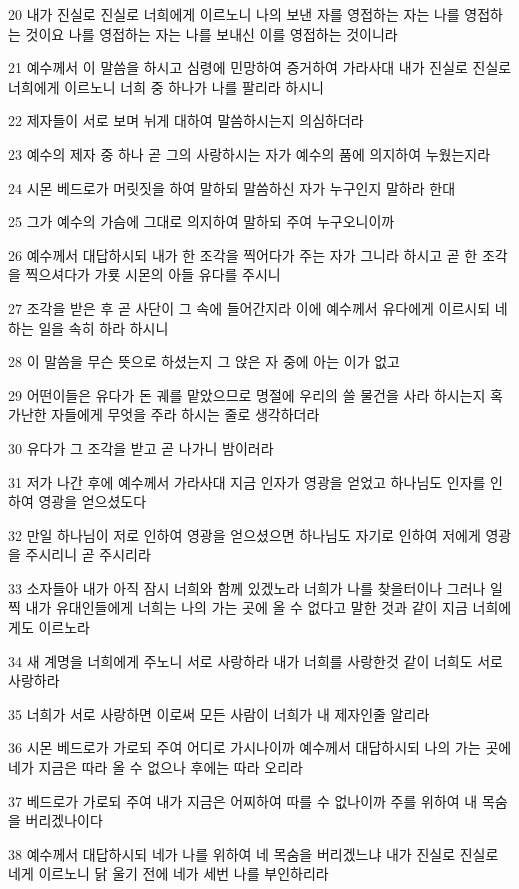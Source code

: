\par 20 내가 진실로 진실로 너희에게 이르노니 나의 보낸 자를 영접하는 자는 나를 영접하는 것이요 나를 영접하는 자는 나를 보내신 이를 영접하는 것이니라
\par 21 예수께서 이 말씀을 하시고 심령에 민망하여 증거하여 가라사대 내가 진실로 진실로 너희에게 이르노니 너희 중 하나가 나를 팔리라 하시니
\par 22 제자들이 서로 보며 뉘게 대하여 말씀하시는지 의심하더라
\par 23 예수의 제자 중 하나 곧 그의 사랑하시는 자가 예수의 품에 의지하여 누웠는지라
\par 24 시몬 베드로가 머릿짓을 하여 말하되 말씀하신 자가 누구인지 말하라 한대
\par 25 그가 예수의 가슴에 그대로 의지하여 말하되 주여 누구오니이까
\par 26 예수께서 대답하시되 내가 한 조각을 찍어다가 주는 자가 그니라 하시고 곧 한 조각을 찍으셔다가 가룟 시몬의 아들 유다를 주시니
\par 27 조각을 받은 후 곧 사단이 그 속에 들어간지라 이에 예수께서 유다에게 이르시되 네 하는 일을 속히 하라 하시니
\par 28 이 말씀을 무슨 뜻으로 하셨는지 그 앉은 자 중에 아는 이가 없고
\par 29 어떤이들은 유다가 돈 궤를 맡았으므로 명절에 우리의 쓸 물건을 사라 하시는지 혹 가난한 자들에게 무엇을 주라 하시는 줄로 생각하더라
\par 30 유다가 그 조각을 받고 곧 나가니 밤이러라
\par 31 저가 나간 후에 예수께서 가라사대 지금 인자가 영광을 얻었고 하나님도 인자를 인하여 영광을 얻으셨도다
\par 32 만일 하나님이 저로 인하여 영광을 얻으셨으면 하나님도 자기로 인하여 저에게 영광을 주시리니 곧 주시리라
\par 33 소자들아 내가 아직 잠시 너희와 함께 있겠노라 너희가 나를 찾을터이나 그러나 일찍 내가 유대인들에게 너희는 나의 가는 곳에 올 수 없다고 말한 것과 같이 지금 너희에게도 이르노라
\par 34 새 계명을 너희에게 주노니 서로 사랑하라 내가 너희를 사랑한것 같이 너희도 서로 사랑하라
\par 35 너희가 서로 사랑하면 이로써 모든 사람이 너희가 내 제자인줄 알리라
\par 36 시몬 베드로가 가로되 주여 어디로 가시나이까 예수께서 대답하시되 나의 가는 곳에 네가 지금은 따라 올 수 없으나 후에는 따라 오리라
\par 37 베드로가 가로되 주여 내가 지금은 어찌하여 따를 수 없나이까 주를 위하여 내 목숨을 버리겠나이다
\par 38 예수께서 대답하시되 네가 나를 위하여 네 목숨을 버리겠느냐 내가 진실로 진실로 네게 이르노니 닭 울기 전에 네가 세번 나를 부인하리라

